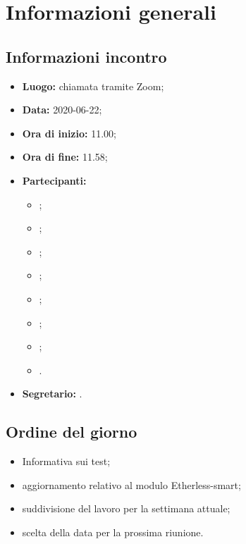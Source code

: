 \section{Informazioni generali}
\subsection{Informazioni incontro}
\begin{itemize}
	\item \textbf{Luogo:} chiamata tramite Zoom;
	\item \textbf{Data:} 2020-06-22;
	\item \textbf{Ora di inizio:} 11.00;
	\item \textbf{Ora di fine:} 11.58;
	\item \textbf{Partecipanti:}
		\begin{itemize}
			\item \VB;
			\item \LB;
			\item \NF;
			\item \EG;
			\item \FJ;
			\item \MP;
			\item \AS;
			\item \AZ.
		\end{itemize}
	\item \textbf{Segretario:} \AS.
\end{itemize}

\subsection{Ordine del giorno}
\begin{itemize}
	\item Informativa sui test;
	\item aggiornamento relativo al modulo Etherless-smart;
	\item suddivisione del lavoro per la settimana attuale;
	\item scelta della data per la prossima riunione.
\end{itemize}
